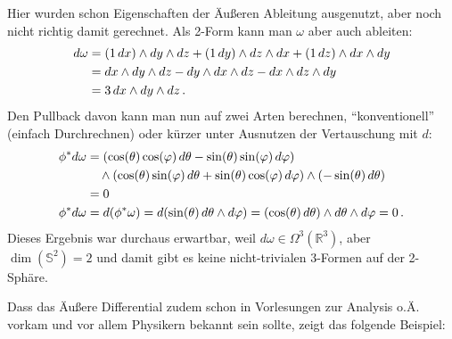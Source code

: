 \documentclass[../H_Analysis_main.tex]{subfiles}
\begin{document}
\begin{bsp}
Hier wurden schon Eigenschaften der Äußeren Ableitung ausgenutzt, aber noch nicht richtig damit gerechnet. Als 2-Form kann man $\omega$ aber auch ableiten:
\begin{align}
d\omega &= (1 \, dx) \wedge dy \wedge dz + (1 \, dy) \wedge dz \wedge dx + (1 \, dz) \wedge dx \wedge dy
\notag\\
&= dx \wedge dy \wedge dz - dy \wedge dx \wedge dz - dx \wedge dz \wedge dy
\notag\\
&= 3 \, dx \wedge dy \wedge dz \, .
\end{align}
Den Pullback davon kann man nun auf zwei Arten berechnen, \enquote{konventionell} (einfach Durchrechnen) oder kürzer unter Ausnutzen der Vertauschung mit $d$:
\begin{align}
\phi^* d\omega &= \qty(\cos(\theta) \cos(\varphi) \, d\theta - \sin(\theta) \sin(\varphi) \, d\varphi) 
\notag\\
& \quad \wedge \qty(\cos(\theta) \sin(\varphi) \, d\theta + \sin(\theta) \cos(\varphi) \, d\varphi) \wedge \qty(- \sin(\theta) \, d\theta)
\notag\\
&= 0
\\
\phi^* d\omega &= d \qty(\phi^* \omega) = d\qty(\sin(\theta) \, d\theta \wedge d\varphi) = \qty(\cos(\theta) \, d\theta) \wedge d\theta \wedge d\varphi = 0 \, .
\end{align}
Dieses Ergebnis war durchaus erwartbar, weil $d\omega \in \Omega^3(\mathbb{R}^3)$, aber $\dim(\mathbb{S}^2) = 2$ und damit gibt es keine nicht-trivialen 3-Formen auf der 2-Sphäre.
\end{bsp}

Dass das Äußere Differential zudem schon in Vorlesungen zur Analysis o.Ä. vorkam und vor allem Physikern bekannt sein sollte, zeigt das folgende Beispiel:
\end{document}
